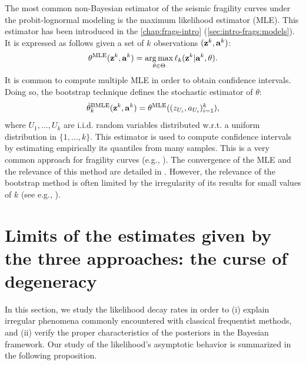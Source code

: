 The most common non-Bayesian estimator of the seismic fragility curves under the probit-lognormal modeling is the maximum likelihood estimator (MLE). This estimator has been introduced in the \cref{chap:frags-intro} (\cref{sec:intro-frags:models}). It is expressed as follows given a set of $k$ observations $(\mathbf{z}^k,\mathbf{a}^k)$:
    \begin{equation}
        \theta^{\text{MLE}}(\mathbf{z}^k,\mathbf{a}^k)=\operatorname*{arg\,max}_{\theta\in\Theta}\ell_k(\mathbf{z}^k|\mathbf{a}^k,\theta).
    \end{equation}
It is common to compute multiple MLE in order to obtain confidence intervals. Doing so, the bootstrap technique defines the stochastic estimator of $\theta$:
    \begin{equation}
        \hat\theta_k^{\text{BMLE}}(\mathbf{z}^k,\mathbf{a}^k) = \theta^{\text{MLE}}((z_{U_i},a_{U_i})_{i=1}^k),
    \end{equation}    
  where $U_1,\dots,U_k$ are i.i.d. random variables distributed w.r.t. a uniform distribution in $\{1,\dots,k\}$.
This estimator is used to compute confidence intervals by estimating empirically its quantiles from many samples. 
This is a very common approach for fragility curves (e.g., 
\cite{shinozuka_statistical_2000,gehl_influence_2015,baker_efficient_2015}). The convergence of the MLE and the relevance of this method are detailed in \cite{van_der_vaart_asymptotic_1992}. However, the relevance of the bootstrap method is often limited by the irregularity of its results for small values of $k$ (see e.g., \cite{zentner_fragility_2017}).





\section{Limits of the estimates given by the three approaches: the curse of degeneracy}\label{sec:PREM:degeneracy}

In this section, we study the likelihood decay rates in order to (i) explain irregular phenomena commonly encountered with classical frequentist methods, and (ii) verify the proper characteristics of the posteriors in the Bayesian framework.
Our study of the likelihood's asymptotic behavior is summarized in the following proposition.

